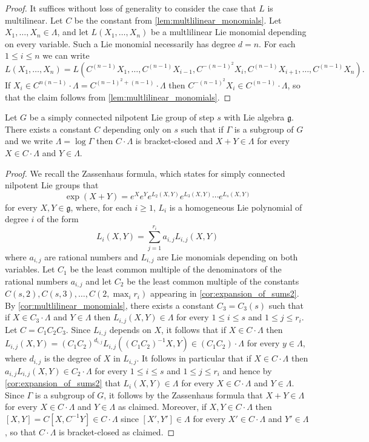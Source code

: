 \begin{proof}
It suffices without loss of generality to consider the case that $L$ is multilinear.
Let $C$ be the constant from \cref{lem:multlilinear_monomials}. Let $X_1,\ldots,X_n \in \Lambda$, and let $L(X_1,\ldots,X_n)$ be a multlilinear Lie monomial depending on every variable. Such a Lie monomial necessarily has degree $d=n$. For each $1\leq i \leq n$ we can write
\[
L(X_1,\ldots,X_n) = L(C^{(n-1)}X_1,\ldots,C^{(n-1)}X_{i-1},C^{-(n-1)^2}X_i,C^{(n-1)}X_{i+1},\ldots,C^{(n-1)}X_n).
\]
If $X_i \in C^{n(n-1)}\cdot \Lambda=C^{(n-1)^2+(n-1)} \cdot \Lambda$ then $C^{-(n-1)^2}X_i \in C^{(n-1)}\cdot \Lambda$, so that the claim follows from \cref{lem:multlilinear_monomials}.
\end{proof}



\begin{lemma}
\label{lem:good_sublattice}
Let $G$ be a simply connected nilpotent Lie group of step $s$ with Lie algebra $\mathfrak{g}$. There exists a constant $C$ depending only on $s$ such that if $\Gamma$ is a subgroup of $G$ and we write $\Lambda = \log \Gamma$ then $C\cdot \Lambda$ is bracket-closed and $X+Y \in \Lambda$ for every $X\in C\cdot \Lambda$ and $Y\in \Lambda$. 
\end{lemma}

\begin{proof}
We recall the Zassenhaus formula, which states for simply connected nilpotent Lie groups that
\[
\exp(X+Y) = e^X e^Y e^{L_2(X,Y)}e^{L_3(X,Y)}\cdots e^{L_s(X,Y)}
\]
for every $X,Y\in \mathfrak{g}$, where, for each $i\geq 1$, $L_i$ is a homogeneous Lie polynomial of degree $i$
of the form
\[
L_i(X,Y) = \sum_{j=1}^{r_i} a_{i,j} L_{i,j}(X,Y)
\]
where $a_{i,j}$ are rational numbers and $L_{i,j}$ are Lie monomials depending on both variables.
%
%
%
Let $C_1$ be the least common multiple of the denominators of the rational numbers $a_{i,j}$ and let $C_2$ be the least common multiple of the constants $C(s,2),C(s,3),\ldots,C(2,\max_i r_i)$ appearing in \cref{cor:expansion_of_sums2}. By \cref{cor:multlilinear_monomials}, there exists a constant $C_3=C_3(s)$ such that if $X\in C_3 \cdot \Lambda$ and $Y\in \Lambda$ then $L_{i,j}(X,Y)\in \Lambda$ for every $1\leq i \leq s$ and $1\leq j \leq r_i$. Let $C=C_1C_2C_3$. Since $L_{i,j}$ depends on $X$, it follows that if $X \in C \cdot \Lambda$ then $L_{i,j}(X,Y)=(C_1C_2)^{d_{i,j}}L_{i,j}((C_1C_2)^{-1}X,Y) \in (C_1C_2)\cdot \Lambda$ for every $y\in \Lambda$, where $d_{i,j}$ is the degree of $X$ in $L_{i,j}$. It follows in particular that if $X\in C\cdot \Lambda$ then $a_{i,j} L_{i,j}(X,Y) \in C_2 \cdot \Lambda$ for every $1\leq i \leq s$ and $1\leq j \leq r_i$ and hence by \cref{cor:expansion_of_sums2} that $L_i(X,Y) \in \Lambda$ for every $X\in C \cdot \Lambda$ and $Y\in \Lambda$. Since $\Gamma$ is a subgroup of $G$, it follows by the Zassenhaus formula that $X+Y\in \Lambda$ for every $X\in C\cdot \Lambda$ and $Y\in \Lambda$ as claimed. Moreover, if $X,Y\in C\cdot \Lambda$ then $[X,Y]=C[X,C^{-1}Y] \in C\cdot \Lambda$ since $[X',Y']\in \Lambda$ for every $X'\in C\cdot \Lambda$ and $Y'\in \Lambda$, so that $C\cdot \Lambda$ is bracket-closed as claimed. 
\end{proof}

